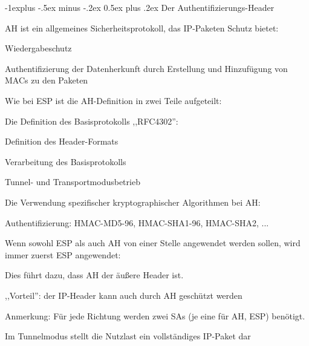 \documentclass[a4paper]{article}
\makeatletter
\renewcommand{\subsection}{\@startsection{subsection}{2}{0mm}%
 {-1explus -.5ex minus -.2ex}%
 {0.5ex plus .2ex}%
 {\normalfont\normalsize\bfseries}}
\makeatother
\begin{document}
\begin{multicols}{3}
      \subsection{Der Authentifizierungs-Header}
      \begin{itemize*}
            \item AH ist ein allgemeines Sicherheitsprotokoll, das IP-Paketen Schutz bietet:
            \begin{itemize*}
                  \item Wiedergabeschutz
                  \item Authentifizierung der Datenherkunft durch Erstellung und Hinzufügung von MACs zu den Paketen
            \end{itemize*}
            \item Wie bei ESP ist die AH-Definition in zwei Teile aufgeteilt:
            \begin{itemize*}
                  \item Die Definition des Basisprotokolls ,,RFC4302'':
                  \begin{itemize*}
                        \item Definition des Header-Formats
                        \item Verarbeitung des Basisprotokolls
                        \item Tunnel- und Transportmodusbetrieb
                  \end{itemize*}
                  \item Die Verwendung spezifischer kryptographischer Algorithmen bei AH:
                  \begin{itemize*}
                        \item Authentifizierung: HMAC-MD5-96, HMAC-SHA1-96, HMAC-SHA2, ...
                        \item Wenn sowohl ESP als auch AH von einer Stelle angewendet werden sollen, wird immer zuerst ESP angewendet:
                  \end{itemize*}
                  \item Dies führt dazu, dass AH der äußere Header ist.
                  \item ,,Vorteil'': der IP-Header kann auch durch AH geschützt werden
                  \item Anmerkung: Für jede Richtung werden zwei SAs (je eine für AH, ESP) benötigt.
            \end{itemize*}
            \item Im Tunnelmodus stellt die Nutzlast ein vollständiges IP-Paket dar

\end{itemize*}
\end{multicols}
\end{document}
